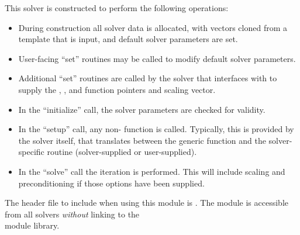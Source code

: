 This solver is constructed to perform the following operations:
\begin{itemize}
\item During construction all {\nvector} solver data is allocated,
  with vectors cloned from a template {\nvector} that is input, and
  default solver parameters are set.
\item User-facing ``set'' routines may be called to modify default
  solver parameters.
\item Additional ``set'' routines are called by the {\sundials} solver
  that interfaces with {\sunlinsolpcg} to supply the 
  , , and  function pointers and
   scaling vector.
\item In the ``initialize'' call, the solver parameters are checked
  for validity.
\item In the ``setup'' call, any non-  function is
  called.  Typically, this is provided by the {\sundials} solver
  itself, that translates between the generic  function and
  the solver-specific routine (solver-supplied or user-supplied).
\item In the ``solve'' call the {\pcg} iteration is performed.  This
  will include scaling and preconditioning if those options have been
  supplied.
\end{itemize}

\noindent The header file to include when using this module 
is . The {\sunlinsolpcg} module
is accessible from all {\sundials} solvers \textit{without}
linking to the \\
 module library. \\


